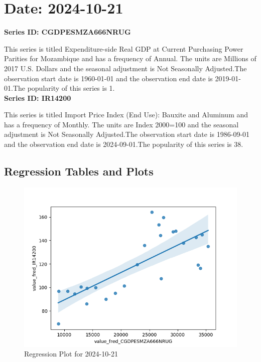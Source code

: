 \section{Date: 2024-10-21}
\noindent \textbf{Series ID: CGDPESMZA666NRUG} 

\noindent This series is titled Expenditure-side Real GDP at Current Purchasing Power Parities for Mozambique and has a frequency of Annual. The units are Millions of 2017 U.S. Dollars and the seasonal adjustment is Not Seasonally Adjusted.The observation start date is 1960-01-01 and the observation end date is 2019-01-01.The popularity of this series is 1. \\ 

\noindent \textbf{Series ID: IR14200} 

\noindent This series is titled Import Price Index (End Use): Bauxite and Aluminum and has a frequency of Monthly. The units are Index 2000=100 and the seasonal adjustment is Not Seasonally Adjusted.The observation start date is 1986-09-01 and the observation end date is 2024-09-01.The popularity of this series is 38. \\ 

\subsection{Regression Tables and Plots}


\begin{figure}
\centering
\includegraphics[scale = 0.9]{plots/plot_2024-10-21.png}
\caption{Regression Plot for 2024-10-21}
\end{figure}
\newpage
